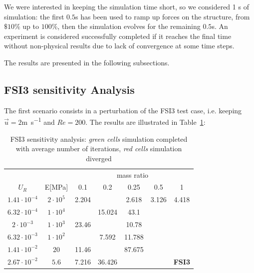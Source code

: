 We were interested in keeping the simulation time short, so we considered 1 \si{s} of simulation: the first $0.5$\si{s} has been used to ramp up forces on the structure, from $\$10\%$ up to $100\%$, then the simulation evolves for the remaining $0.5$\si{s}. An experiment is considered successfully completed if it reaches the final time without non-physical results due to lack of convergence at some time steps.

The results are presented in the following subsections.


\subsection{FSI3 sensitivity Analysis}

The first scenario consists in a perturbation of the FSI3 test case, i.e. keeping $\vec{u}=2$\si{m.s^{-1}} and $Re=200$. The results are illustrated in Table~\ref{table:FSI3-sens}:

% 
\begin{table}[!htb]
	\begin{center}
		\begin{tabular}{ c | c | c c c c c |} 
			&  & \multicolumn{5}{c|}{mass ratio} \\
			
			$U_R$ & E[\si{MPa}] & 0.1 & 0.2 & 0.25 & 0.5 & 1 \\
			\hline
			
			$1.41\cdot 10^{-4}$ & $2\cdot 10^{5}$ & \cellcolor{green!10}2.204 & \cellcolor{green!10} & \cellcolor{green!10}2.618 & \cellcolor{green!10}3.126 & \cellcolor{green!10}4.418 \\
			$6.32\cdot 10^{-4}$ & $1\cdot 10^{4}$ & \cellcolor{green!10} & \cellcolor{green!10}15.024 & \cellcolor{green!10}43.1 & \cellcolor{red!10} & \cellcolor{red!10} \\        
			$2\cdot 10^{-3}$ & $1\cdot 10^{3}$ & \cellcolor{green!10}23.46 & \cellcolor{green!10} & \cellcolor{green!10}10.78 & \cellcolor{red!10} & \cellcolor{red!10} \\
			$6.32\cdot 10^{-3}$ & $1\cdot 10^{2}$ & \cellcolor{green!10} & \cellcolor{green!10}7.592 & \cellcolor{green!10}11.788 & \cellcolor{red!10} & \cellcolor{red!10} \\
			$1.41\cdot 10^{-2}$ & $20$ & \cellcolor{green!10}11.46 & \cellcolor{green!10} & \cellcolor{green!10}87.675 & \cellcolor{red!10} & \cellcolor{red!10} \\
			$2.67\cdot 10^{-2}$ & $5.6$ & \cellcolor{green!10}7.216 & \cellcolor{green!10}36.426 & \cellcolor{red!10} & \cellcolor{red!10} & \cellcolor{red!10}\textbf{FSI3} \\
			\hline                        
		\end{tabular}
	\end{center}
	\caption{FSI3 sensitivity analysis: \textit{green cells} simulation completed with average number of iterations, \textit{red cells} simulation diverged}
	\label{table:FSI3-sens}
\end{table}



